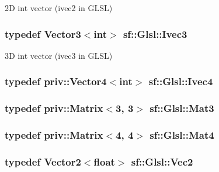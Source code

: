 2\-D int vector ({\ttfamily ivec2} in G\-L\-S\-L) 

\hypertarget{namespacesf_1_1_glsl_a64f403dd0219e7f128ffddca641394df}{
\subsubsection[{Ivec3}]{\setlength{\rightskip}{0pt plus 5cm}typedef {\bf Vector3}$<${\bf int}$>$ {\bf sf\-::\-Glsl\-::\-Ivec3}}}\label{namespacesf_1_1_glsl_a64f403dd0219e7f128ffddca641394df}


3\-D int vector ({\ttfamily ivec3} in G\-L\-S\-L) 

\hypertarget{namespacesf_1_1_glsl_abcba8791f75382199ea03f6932a91d9b}{
\subsubsection[{Ivec4}]{\setlength{\rightskip}{0pt plus 5cm}typedef {\bf priv\-::\-Vector4}$<${\bf int}$>$ {\bf sf\-::\-Glsl\-::\-Ivec4}}}\label{namespacesf_1_1_glsl_abcba8791f75382199ea03f6932a91d9b}
\hypertarget{namespacesf_1_1_glsl_a1bf4595b60b08c79473a882e2c1dbff8}{
\subsubsection[{Mat3}]{\setlength{\rightskip}{0pt plus 5cm}typedef {\bf priv\-::\-Matrix}$<$3, 3$>$ {\bf sf\-::\-Glsl\-::\-Mat3}}}\label{namespacesf_1_1_glsl_a1bf4595b60b08c79473a882e2c1dbff8}
\hypertarget{namespacesf_1_1_glsl_aab545f0a373a3ea8ad145811b747f3e4}{
\subsubsection[{Mat4}]{\setlength{\rightskip}{0pt plus 5cm}typedef {\bf priv\-::\-Matrix}$<$4, 4$>$ {\bf sf\-::\-Glsl\-::\-Mat4}}}\label{namespacesf_1_1_glsl_aab545f0a373a3ea8ad145811b747f3e4}
\hypertarget{namespacesf_1_1_glsl_adeed356d346d87634b4c197a530e4edf}{
\subsubsection[{Vec2}]{\setlength{\rightskip}{0pt plus 5cm}typedef {\bf Vector2}$<$float$>$ {\bf sf\-::\-Glsl\-::\-Vec2}}}\label{namespacesf_1_1_glsl_adeed356d346d87634b4c197a530e4edf}


